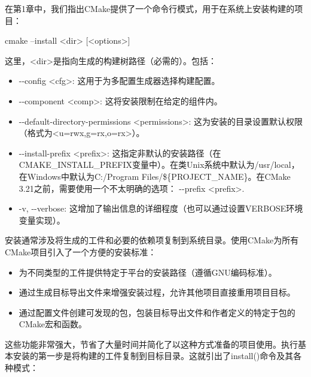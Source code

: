 
在第1章中，我们指出CMake提供了一个命令行模式，用于在系统上安装构建的项目：

\begin{shell}
cmake --install <dir> [<options>]
\end{shell}

这里，<dir>是指向生成的构建树路径（必需的）。包括：

\begin{itemize}
\item
-{}-config <cfg>: 这用于为多配置生成器选择构建配置。

\item
-{}-component <comp>: 这将安装限制在给定的组件内。

\item
-{}-default-directory-permissions <permissions>: 这为安装的目录设置默认权限（格式为<u=rwx,g=rx,o=rx>）。

\item
-{}-install-prefix <prefix>: 这指定非默认的安装路径（在CMAKE\_INSTALL\_PREFIX变量中）。在类Unix系统中默认为/usr/local，在Windows中默认为C:/Program Files/\$\{PROJECT\_NAME\}。在CMake 3.21之前，需要使用一个不太明确的选项： -{}-prefix <prefix>.

\item
-v, -{}-verbose: 这增加了输出信息的详细程度（也可以通过设置VERBOSE环境变量实现）。
\end{itemize}

安装通常涉及将生成的工件和必要的依赖项复制到系统目录。使用CMake为所有CMake项目引入了一个方便的安装标准：

\begin{itemize}
\item
为不同类型的工件提供特定于平台的安装路径（遵循GNU编码标准）。

\item
通过生成目标导出文件来增强安装过程，允许其他项目直接重用项目目标。

\item
通过配置文件创建可发现的包，包装目标导出文件和作者定义的特定于包的CMake宏和函数。
\end{itemize}

这些功能非常强大，节省了大量时间并简化了以这种方式准备的项目使用。执行基本安装的第一步是将构建的工件复制到目标目录。这就引出了install()命令及其各种模式：

